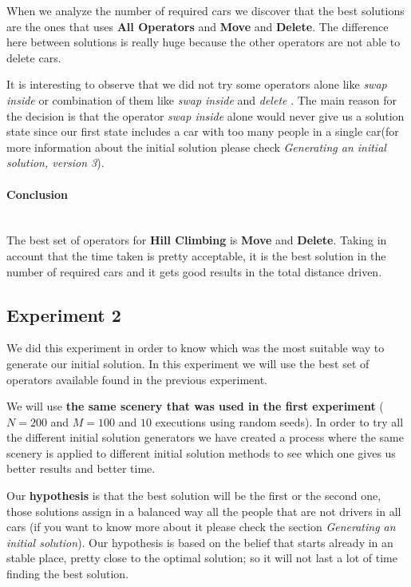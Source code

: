 \documentclass[12]{article}
\begin{document}
When we analyze the number of required cars we discover that the best solutions are the ones that uses \textbf{All Operators} and \textbf{Move} and \textbf{Delete}. The difference here between solutions is really huge because the other operators are not  able to delete cars. 


It is interesting to observe that we did not try some operators alone like \textit{swap inside} or combination of them like \textit{swap inside} and \textit{delete} . The main reason for the decision is that the operator \textit{swap inside} alone would never give us a solution state since our first state includes a car with too many people in a single car(for more information about the initial solution please check \textit{Generating an initial solution, version 3}). 
\\
\smallskip

\paragraph{Conclusion}\mbox{}\\
The best set of operators for \textbf{Hill Climbing} is \textbf{Move} and \textbf{Delete}. Taking in account that the time taken is pretty acceptable, it is the best solution in the number of required cars and it gets good results in the total distance driven.

\subsection{Experiment 2}
We did this experiment in order to know which was the most suitable way to generate our initial solution. In this experiment we will use the best set of operators available found in the previous experiment.

We will use \textbf{the same scenery that was used in the first experiment} ($N=200$ and $M=100$ and $10$ executions using random seeds).  In order to try all the different initial solution generators we have created a process where the same scenery is applied to different initial solution methods to see which one gives us better results and better time. 

Our \textbf{hypothesis} is that the best solution will be the first or the second one, those solutions assign in a balanced way all the people that are not drivers in all cars (if you want to know more about it please check the section \textit{Generating an initial solution}). Our hypothesis is based on the belief that starts already in an stable place, pretty close to the optimal solution; so it will not last a lot of time finding the best solution. 
\end{document}
